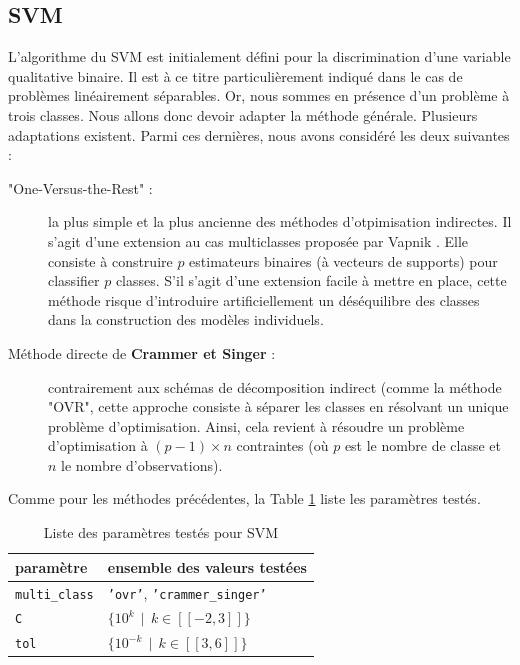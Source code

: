 \documentclass[a4paper]{report}
\begin{document}
\subsection{SVM}

L'algorithme du SVM est initialement défini pour la discrimination d'une variable qualitative binaire. Il est à ce titre particulièrement indiqué dans le cas de problèmes linéairement séparables. Or, nous sommes en présence d'un problème à trois classes. Nous allons donc devoir adapter la méthode générale. Plusieurs adaptations existent. Parmi ces dernières, nous avons considéré les deux suivantes :

\begin{description}
\item["One-Versus-the-Rest" :] la plus simple et la plus ancienne des méthodes d'otpimisation indirectes. Il s'agit d'une extension au cas multiclasses proposée par Vapnik \cite{Vapnik}. Elle consiste à construire $p$ estimateurs binaires (à vecteurs de supports) pour classifier $p$ classes. S'il s'agit d'une extension facile à mettre en place, cette méthode risque d'introduire artificiellement un déséquilibre des classes dans la construction des modèles individuels.
\item[Méthode directe de \textbf{Crammer et Singer} \cite{Crammer} :] contrairement aux schémas de décomposition indirect (comme la méthode "OVR", cette approche consiste à séparer les classes en résolvant un unique problème d'optimisation. Ainsi, cela revient à résoudre un problème d'optimisation à $(p-1)\times n$ contraintes (où $p$ est le nombre de classe et $n$ le nombre d'observations).
\end{description}
Comme pour les méthodes précédentes, la Table \ref{params_svm} liste les paramètres testés.

\begin{table}
\centering
\begin{tabular}{ll}
paramètre & ensemble des valeurs testées \\
\hline
\texttt{multi\_class} & \texttt{'ovr'}, \texttt{'crammer\_singer'} \\
\texttt{C} & $\{10^k \>\> | \>\> k \in [\![-2, 3]\!] \}$ \\
\texttt{tol} & $\{10^{-k} \>\> | \>\> k \in [\![3, 6]\!] \}$ \\
\end{tabular}
\caption{Liste des paramètres testés pour SVM\label{params_svm}}
\end{table}
\end{document}
